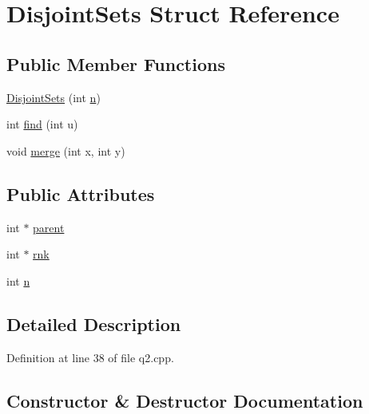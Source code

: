 \hypertarget{struct_disjoint_sets}{}\section{Disjoint\+Sets Struct Reference}
\label{struct_disjoint_sets}
\subsection*{Public Member Functions}
\begin{DoxyCompactItemize}
\item 
\hyperlink{struct_disjoint_sets_a26da401bf4e56a876533c97643c7d9c2}{Disjoint\+Sets} (int \hyperlink{struct_disjoint_sets_aeb43c9e003e2bd5b83b5c60d56dfd23e}{n})
\item 
int \hyperlink{struct_disjoint_sets_a14ff5306079945dd59c0c6d55129ac2e}{find} (int u)
\item 
void \hyperlink{struct_disjoint_sets_a349af3d249271920c355d9ef2a641f87}{merge} (int x, int y)
\end{DoxyCompactItemize}
\subsection*{Public Attributes}
\begin{DoxyCompactItemize}
\item 
int $\ast$ \hyperlink{struct_disjoint_sets_ad7f9caf9365a04a1c6670aa372a3cdbd}{parent}
\item 
int $\ast$ \hyperlink{struct_disjoint_sets_a93f26d80d2fb349bd97793fb41e502e8}{rnk}
\item 
int \hyperlink{struct_disjoint_sets_aeb43c9e003e2bd5b83b5c60d56dfd23e}{n}
\end{DoxyCompactItemize}


\subsection{Detailed Description}


Definition at line 38 of file q2.\+cpp.



\subsection{Constructor \& Destructor Documentation}
\mbox{\label{struct_disjoint_sets_a26da401bf4e56a876533c97643c7d9c2}} 
